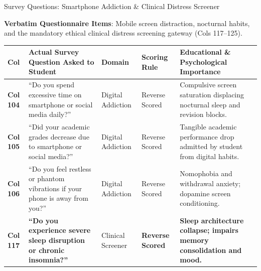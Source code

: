 \documentclass{beamer}
\begin{document}
\begin{frame}[t]{Survey Questions: Smartphone Addiction \& Clinical Distress Screener}
  \vspace{-0.20cm}
  \begin{topsummarybar}
    \fontsize{5.8pt}{7.0pt}\selectfont
    \textbf{\color{NavyDark}Verbatim Questionnaire Items}: Mobile screen distraction, nocturnal habits, and the mandatory ethical clinical distress screening gateway (Cols 117--125).
  \end{topsummarybar}
  \vspace{-0.25cm}

  \begin{tcolorbox}[colback=white, colframe=BlueDeep, arc=1.2mm, boxrule=0.7pt, top=0.3mm, bottom=0.3mm, left=0.8mm, right=0.8mm]
    \fontsize{4.2pt}{5.0pt}\selectfont
    \renewcommand{\arraystretch}{0.55}
    \begin{tabularx}{\linewidth}{@{}p{0.7cm} p{4.2cm} p{1.6cm} p{1.6cm} X@{}}
      \toprule
      \rowcolor{NavyDark}
      \textbf{\color{white}Col} & \textbf{\color{white}Actual Survey Question Asked to Student} & \textbf{\color{white}Domain} & \textbf{\color{white}Scoring Rule} & \textbf{\color{white}Educational \& Psychological Importance} \\
      \midrule
      \rowcolor{BlueLight} \textbf{Col 104} & ``Do you spend excessive time on smartphone or social media daily?'' & Digital Addiction & Reverse Scored & Compulsive screen saturation displacing nocturnal sleep and revision blocks. \\
      \rowcolor{CanvasBG} \textbf{Col 105} & ``Did your academic grades decrease due to smartphone or social media?'' & Digital Addiction & Reverse Scored & Tangible academic performance drop admitted by student from digital habits. \\
      \rowcolor{BlueLight} \textbf{Col 106} & ``Do you feel restless or phantom vibrations if your phone is away from you?'' & Digital Addiction & Reverse Scored & Nomophobia and withdrawal anxiety; dopamine screen conditioning. \\
      \midrule
      \rowcolor{GoldBG} \textbf{Col 117} & \textbf{``Do you experience severe sleep disruption or chronic insomnia?''} & Clinical Screener & \textbf{Reverse Scored} & \textbf{Sleep architecture collapse; impairs memory consolidation and mood.} \\

\end{tabularx}
\end{tcolorbox}
\end{frame}
\end{document}
